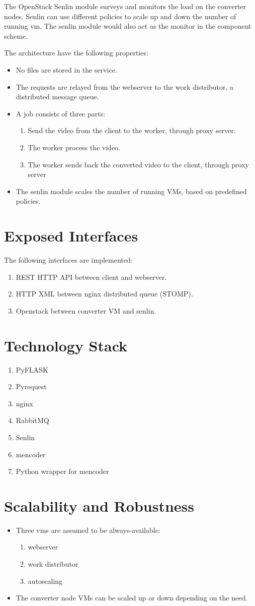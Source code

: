 \documentclass[]{article}
\begin{document}
The OpenStack Senlin module surveys and monitors the load on the
converter nodes. Senlin can use different policies to scale up and
down the number of running vm. The senlin module would also act as the
monitor in the component scheme.

The architecture have the following properties:
\begin{itemize}
\item No files are stored in the service.
\item The requests are relayed from the webserver to the work distributor, a distributed message queue.
\item A job consists of three parts:
  \begin{enumerate}
  \item Send the video from the client to the worker, through proxy server.
  \item The worker process the video.
  \item The worker sends back the converted video to the client, through proxy server
  \end{enumerate}
\item The senlin module scales the number of running VMs, based on predefined policies.
\end{itemize}

\section*{Exposed Interfaces}

The following interfaces are implemented:

\begin{enumerate}
\item REST HTTP API between client and webserver.
\item HTTP XML between nginx distributed queue (STOMP).
\item Openstack between converter VM and senlin.
\end{enumerate}

\section*{Technology Stack}
\begin{enumerate}
\item PyFLASK
\item Pyrequest
\item nginx
\item RabbitMQ
\item Senlin
\item mencoder
\item Python wrapper for mencoder
\end{enumerate}

\section*{Scalability and Robustness}

\begin{itemize}
\item Three vms are assumed to be always-available:
  \begin{enumerate}
  \item webserver
  \item work distributor
  \item autoscaling
  \end{enumerate}
\item The converter node VMs can be scaled up or down depending on the need.
\end{itemize}
\end{document}
